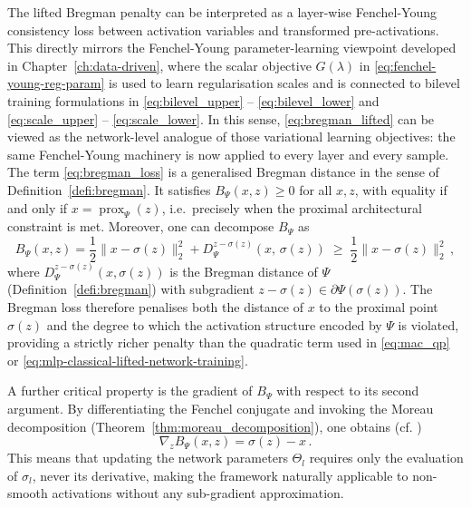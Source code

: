The lifted Bregman penalty can be interpreted as a layer-wise Fenchel-Young consistency loss between activation variables and transformed pre-activations. This directly mirrors the Fenchel-Young parameter-learning viewpoint developed in Chapter~\ref{ch:data-driven}, where the scalar objective $G(\lambda)$ in \eqref{eq:fenchel-young-reg-param} is used to learn regularisation scales and is connected to bilevel training formulations in \eqref{eq:bilevel_upper} -- \eqref{eq:bilevel_lower} and \eqref{eq:scale_upper} -- \eqref{eq:scale_lower}. In this sense, \eqref{eq:bregman_lifted} can be viewed as the network-level analogue of those variational learning objectives: the same Fenchel-Young machinery is now applied to every layer and every sample.
The term \eqref{eq:bregman_loss} is a generalised Bregman distance in the sense of Definition~\ref{defi:bregman}. It satisfies $B_{\Psi}(x,z) \geq 0$ for all $x, z$, with equality if and only if $x = \operatorname{prox}_{\Psi}(z)$, i.e.\ precisely when the proximal architectural constraint is met. Moreover, one can decompose $B_\Psi$ as
\begin{equation}\label{eq:bregman_loss_decomposition}
    B_{\Psi}(x, z) = \frac{1}{2}\|x - \sigma(z)\|_2^2 + D_{\Psi}^{z - \sigma(z)}\!\left(x,\, \sigma(z)\right) \;\geq\; \frac{1}{2}\|x - \sigma(z)\|_2^2 \, ,
\end{equation}
where $D_{\Psi}^{z-\sigma(z)}(x, \sigma(z))$ is the Bregman distance of $\Psi$ (Definition~\ref{defi:bregman}) with subgradient $z - \sigma(z) \in \partial\Psi(\sigma(z))$. The Bregman loss therefore penalises both the distance of $x$ to the proximal point $\sigma(z)$ and the degree to which the activation structure encoded by $\Psi$ is violated, providing a strictly richer penalty than the quadratic term used in \eqref{eq:mac_qp} or \eqref{eq:mlp-classical-lifted-network-training}.

A further critical property is the gradient of $B_\Psi$ with respect to its second argument. By differentiating the Fenchel conjugate and invoking the Moreau decomposition (Theorem~\ref{thm:moreau_decomposition}), one obtains (cf. \cite{WangBenning2023})
\begin{equation}\label{eq:bregman_loss_gradient}
    \nabla_z B_{\Psi}(x, z) = \sigma(z) - x \, .
\end{equation}
This means that updating the network parameters $\Theta_l$ requires only the evaluation of $\sigma_l$, never its derivative, making the framework naturally applicable to non-smooth activations without any sub-gradient approximation.

